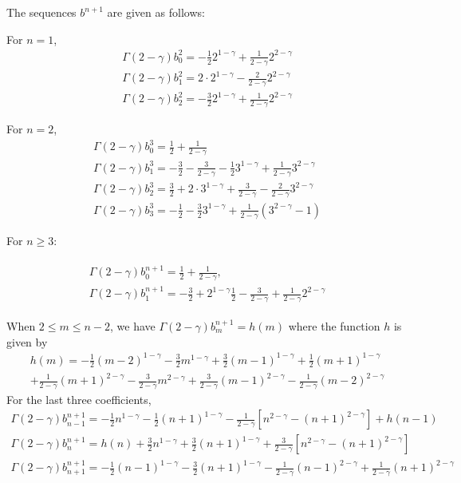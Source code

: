 \documentclass[11pt]{article} %
\begin{document}
The sequences $b^{n+1}$ are given as follows:

For $n=1$,
\begin{gather*}
\Gamma(2-\gamma)b_{0}^{2}=-\frac{1}{2}2^{1-\gamma}+\frac{1}{2-\gamma}2^{2-\gamma}\\
\Gamma(2-\gamma)b_{1}^{2}=2\cdot 2^{1-\gamma}-\frac{2}{2-\gamma}2^{2-\gamma}\\
\Gamma(2-\gamma)b_{2}^{2}=-\frac{3}{2}2^{1-\gamma}+\frac{1}{2-\gamma}2^{2-\gamma}
\end{gather*}

For $n=2$,
\begin{gather*}
\Gamma(2-\gamma)b_{0}^{3}=\frac{1}{2}+\frac{1}{2-\gamma}\\
\Gamma(2-\gamma)b_{1}^{3}
=-\frac{3}{2}-\frac{3}{2-\gamma}-\frac{1}{2}3^{1-\gamma}
+\frac{1}{2-\gamma}3^{2-\gamma}\\
\Gamma(2-\gamma)b_{2}^{3}=\frac{3}{2}+2\cdot 3^{1-\gamma}
+\frac{3}{2-\gamma}-\frac{2}{2-\gamma}3^{2-\gamma}\\
\Gamma(2-\gamma)b_{3}^{3}=-\frac{1}{2}
-\frac{3}{2}3^{1-\gamma}+\frac{1}{2-\gamma}(3^{2-\gamma}-1)
\end{gather*}

For $n\ge 3$:

\begin{gather}
\begin{array}{c}
\Gamma(2-\gamma)b_{0}^{n+1}=\frac{1}{2}+\frac{1}{2-\gamma},\\
\Gamma(2-\gamma)b_1^{n+1}=-\frac{3}{2}+2^{1-\gamma}\frac{1}{2}
-\frac{3}{2-\gamma}+\frac{1}{2-\gamma}2^{2-\gamma}
 \end{array}
\end{gather}

When $2\le m\le n-2$, we have $\Gamma(2-\gamma)b_{m}^{n+1}=h(m)$ where the function $h$ is given by
\begin{multline}
h(m)=-\frac{1}{2}(m-2)^{1-\gamma}-\frac{3}{2}m^{1-\gamma}+\frac{3}{2}(m-1)^{1-\gamma}+\frac{1}{2}(m+1)^{1-\gamma}\\
+\frac{1}{2-\gamma}(m+1)^{2-\gamma}
-\frac{3}{2-\gamma}m^{2-\gamma}
+\frac{3}{2-\gamma}(m-1)^{2-\gamma}
-\frac{1}{2-\gamma}(m-2)^{2-\gamma}
\end{multline}
For the last three coefficients,
\begin{gather}
\Gamma(2-\gamma)b_{n-1}^{n+1}
=-\frac{1}{2}n^{1-\gamma}-\frac{1}{2}(n+1)^{1-\gamma}
-\frac{1}{2-\gamma}[n^{2-\gamma}-(n+1)^{2-\gamma}]
+h(n-1)\\
\Gamma(2-\gamma)b_n^{n+1}=h(n)+\frac{3}{2}n^{1-\gamma}+\frac{3}{2}(n+1)^{1-\gamma}
+\frac{3}{2-\gamma}[n^{2-\gamma}-(n+1)^{2-\gamma}]\\
\Gamma(2-\gamma)b_{n+1}^{n+1}
=-\frac{1}{2}(n-1)^{1-\gamma}-\frac{3}{2}(n+1)^{1-\gamma}
-\frac{1}{2-\gamma}(n-1)^{2-\gamma}+\frac{1}{2-\gamma}(n+1)^{2-\gamma}
\end{gather}
\end{document}
